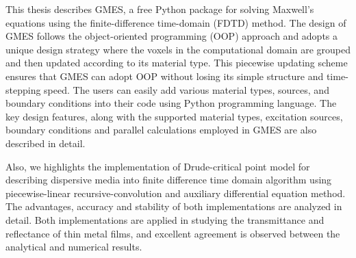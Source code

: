 
This thesis describes GMES, a free Python package for solving Maxwell's equations using the finite-difference time-domain (FDTD) method. The design of GMES follows the object-oriented programming (OOP) approach and adopts a unique design strategy where the voxels in the computational domain are grouped and then updated according to its material type. This piecewise updating scheme ensures that GMES can adopt OOP without losing its simple structure and time-stepping speed. The users can easily add various material types, sources, and boundary conditions into their code using Python programming language. The key design features, along with the supported material types, excitation sources, boundary conditions and parallel calculations employed in GMES are also described in detail.

Also, we highlights the implementation of Drude-critical point model for describing dispersive media into finite difference time domain algorithm using piecewise-linear recursive-convolution and auxiliary differential equation method. The advantages, accuracy and stability of both implementations are analyzed in detail. Both implementations are applied in studying the transmittance and reflectance of thin metal films, and excellent agreement is observed between the analytical and numerical results.
